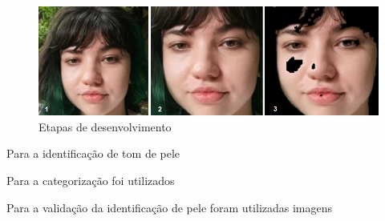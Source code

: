 \begin{figure}[h]
\centering
\caption{Etapas de desenvolvimento}
\includegraphics{Template_Latex_TCC-UNIFTEC/_lib/imagens/vittoriatestes.png}

\label{fig:x Etapas_de_teste}
\end{figure}

Para a identificação de tom de pele 

Para a categorização foi utilizados 

Para a validação da identificação de pele foram utilizadas imagens 

